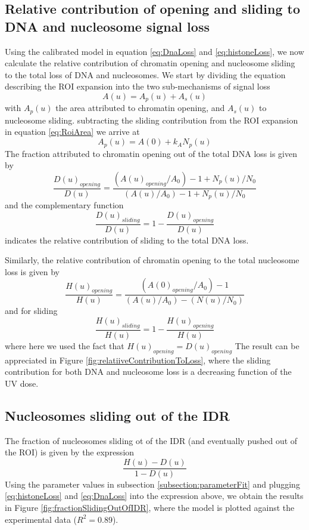 \documentclass[12pt]{article}
\begin{document}
\subsection{Relative contribution of opening and sliding to DNA and nucleosome signal loss}
Using the calibrated model in equation \ref{eq:DnaLoss} and \ref{eq:histoneLoss}, we now calculate the relative contribution of chromatin opening and nucleosome sliding to the total loss of DNA and nucleosomes.
We start by dividing the equation describing the ROI expansion into the two sub-mechanisms of signal loss
\begin{equation*}
A(u) = A_p(u)+A_s(u)
\end{equation*}
with $A_p(u)$ the area attributed to chromatin opening, and $A_s(u)$ to nucleosome sliding. 
subtracting the sliding contribution from the ROI expansion in equation \ref{eq:RoiArea} we arrive at
\begin{equation}
A_p(u)= A(0)+k_AN_p(u)
\end{equation}
The fraction attributed to chromatin opening out of the total DNA loss is given by 
\begin{equation}\label{eq:openingContributionDNA}
\frac{D(u)_{opening}}{D(u)}=\frac{\left(A(u)_{opening}/A_0\right)-1+N_p(u)/N_0}{\left(A(u)/A_0\right) -1 +N_p(u)/N_0}
\end{equation}
and the complementary function 
\begin{equation}\label{eq:slidingContributionDNA}
\frac{D(u)_{sliding}}{D(u)}=1-\frac{D(u)_{opening}}{D(u)}
\end{equation}
indicates the relative contribution of sliding to the total DNA loss. 

Similarly, the relative contribution of chromatin opening to the total nucleosome loss is given by 
\begin{equation}\label{eq:openingContributionHistones}
\frac{H(u)_{opening}}{H(u)} =\frac{\left(A(0)_{opening}/A_0\right)-1}{(A(u)/A_0)-(N(u)/N_0)}
\end{equation}
and for sliding
\begin{equation}\label{eq:slidingContributionHistones}
\frac{H(u)_{sliding}}{H(u)} = 1-\frac{H(u)_{opening}}{H(u)} 
\end{equation}
where here we used the fact that $H(u)_{opening}=D(u)_{opening}$
The result can be appreciated in Figure \ref{fig:relatiiveContributionToLoss}, where the sliding contribution for both DNA and nucleosome loss is a decreasing function of the UV dose. 

\subsection{Nucleosomes sliding out of the IDR}
The fraction of nucleosomes sliding ot of the IDR (and eventually pushed out of the ROI) is given by the expression 
\begin{equation}
\frac{H(u)-D(u)}{1-D(u)}
\end{equation}
Using the parameter values in subsection \ref{subsection:parameterFit} and plugging \ref{eq:histoneLoss} and \ref{eq:DnaLoss} into the expression above, we obtain the results in Figure \ref{fig:fractionSlidingOutOfIDR}, where the model is plotted against the experimental data ($R^2=0.89$). 
\end{document}
